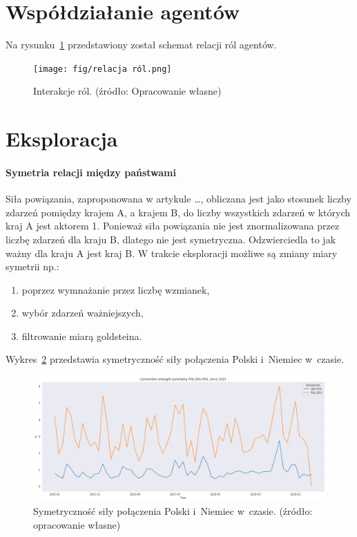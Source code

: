 \documentclass[11pt]{report}
\begin{document}
    \section{Współdziałanie agentów}
    Na rysunku~\ref{fig:relacje} przedstawiony został schemat relacji ról agentów.
    \begin{figure}[!ht]
        \centering
        \texttt{[image: fig/relacja ról.png]}
        \caption{Interakcje ról. (źródło: Opracowanie własne)}
        \label{fig:relacje}
    \end{figure}


    \section{Eksploracja}

    \paragraph{Symetria relacji między państwami}\label{symetria_relacji}
    Siła powiązania, zaproponowana w artykule \ldots, obliczana jest jako stosunek liczby zdarzeń pomiędzy krajem A, a krajem B, do liczby wszystkich zdarzeń w których kraj A jest aktorem 1.
    Ponieważ siła powiązania nie jest znormalizowana przez liczbę zdarzeń dla kraju B, dlatego nie jest symetryczna.
    Odzwierciedla to jak ważny dla kraju A jest kraj B.
    W trakcie eksploracji możliwe są zmiany miary symetrii np.:
    \begin{enumerate}
        \item poprzez wymnażanie przez liczbę wzmianek,
        \item wybór zdarzeń ważniejszych,
        \item filtrowanie miarą goldsteina.
    \end{enumerate}

    Wykres~\ref{fig:POL-DEU-POL} przedstawia symetryczność siły połączenia Polski i~Niemiec w~czasie.
    \begin{figure}[!htp]
        \centering
        \includegraphics[width=\linewidth]{fig/POL-DEU-POL.png}
        \caption{Symetryczność siły połączenia Polski i~Niemiec w~czasie. (źródło: opracowanie własne)}
        \label{fig:POL-DEU-POL}
    \end{figure}
\end{document}

